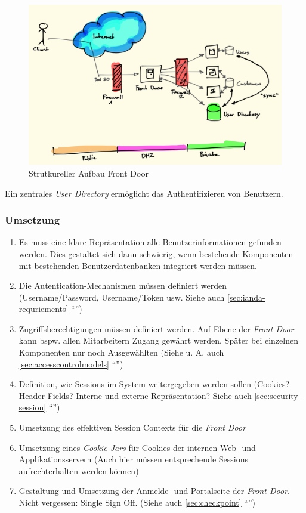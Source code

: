 \begin{figure}[H]
	\centering
	\includegraphics[width=12cm]{content/security/secure-internet-applications/images/front-door.png}
	\caption{Strutkureller Aufbau Front Door}
\end{figure}

Ein zentrales \emph{User Directory} ermöglicht das Authentifizieren von Benutzern.

\subsubsection*{Umsetzung}
\begin{enumerate}
	\item Es muss eine klare Repräsentation alle Benutzerinformationen gefunden werden. Dies gestaltet sich dann schwierig, wenn bestehende Komponenten mit bestehenden Benutzerdatenbanken integriert werden müssen.
	\item Die Autentication-Mechanismen müssen definiert werden (Username/Password, Username/Token usw. Siehe auch \ref{sec:ianda-requriements} ``'')
	\item Zugriffsberechtigungen müssen definiert werden. Auf Ebene der \emph{Front Door} kann bspw. allen Mitarbeitern Zugang gewährt werden. Später bei einzelnen Komponenten nur noch Ausgewählten (Siehe u. A. auch \ref{sec:accesscontrolmodels} ``'')
	\item Definition, wie Sessions im System weitergegeben werden sollen (Cookies? Header-Fields? Interne und externe Repräsentation? Siehe auch \ref{sec:security-session} ``'')
	\item Umsetzung des effektiven Session Contexts für die \emph{Front Door}
	\item Umsetzung eines \emph{Cookie Jars} für Cookies der internen Web- und Applikationsservern (Auch hier müssen entsprechende Sessions aufrechterhalten werden können)
	\item Gestaltung und Umsetzung der Anmelde- und Portalseite der \emph{Front Door}. Nicht vergessen: Single Sign Off. (Siehe auch \ref{sec:checkpoint} ``'')
\end{enumerate}


